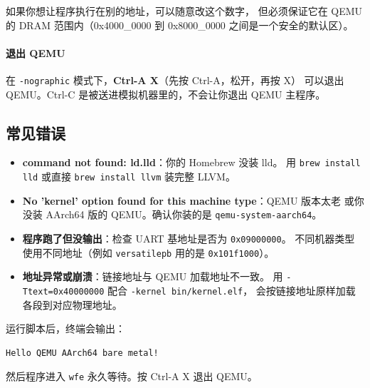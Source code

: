 如果你想让程序执行在别的地址，可以随意改这个数字，
但必须保证它在 QEMU 的 DRAM 范围内（0x4000\_0000 到 0x8000\_0000 之间是一个安全的默认区）。

\paragraph{退出 QEMU}
在 \texttt{-nographic} 模式下，\textbf{Ctrl-A X}（先按 Ctrl-A，松开，再按 X）
可以退出 QEMU。Ctrl-C 是被送进模拟机器里的，不会让你退出 QEMU 主程序。

\subsection{常见错误}

\begin{itemize}
    \item \textbf{command not found: ld.lld}：你的 Homebrew 没装 lld。
        用 \texttt{brew install lld} 或直接 \texttt{brew install llvm} 装完整 LLVM。
    \item \textbf{No 'kernel' option found for this machine type}：QEMU 版本太老
        或你没装 AArch64 版的 QEMU。确认你装的是 \texttt{qemu-system-aarch64}。
    \item \textbf{程序跑了但没输出}：检查 UART 基地址是否为 \texttt{0x09000000}。
        不同机器类型使用不同地址（例如 \texttt{versatilepb} 用的是 \texttt{0x101f1000}）。
    \item \textbf{地址异常或崩溃}：链接地址与 QEMU 加载地址不一致。
        用 \texttt{-Ttext=0x40000000} 配合 \texttt{-kernel bin/kernel.elf}，
        会按链接地址原样加载各段到对应物理地址。
\end{itemize}

运行脚本后，终端会输出：

\begin{verbatim}
Hello QEMU AArch64 bare metal!
\end{verbatim}

然后程序进入 \texttt{wfe} 永久等待。按 Ctrl-A X 退出 QEMU。
